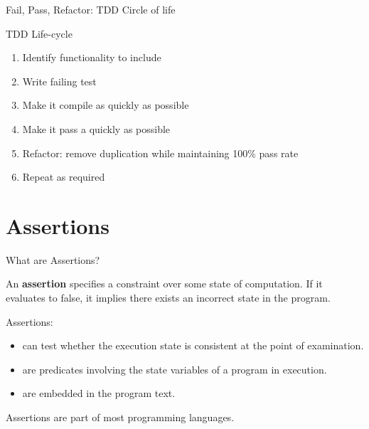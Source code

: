 \documentclass[11pt, xcolor=svgnames]{beamer}
\providecommand{\alert}[1]{\textbf{#1}}
\begin{document}


\begin{frame}{Fail, Pass, Refactor:  TDD Circle of life}

\begin{block}{TDD Life-cycle}
	\begin{enumerate}
		\item Identify functionality to include
		\item Write failing test
		\item Make it compile as quickly as possible
		\item Make it pass a quickly as possible
		\item Refactor: remove duplication while maintaining 100\% pass rate
		\item Repeat as required
	\end{enumerate}
\end{block}

\end{frame}


\section{Assertions}


\begin{frame}{What are Assertions?}

  An \alert{assertion} specifies a constraint over some state of computation. If it evaluates to false, it implies there exists an incorrect state in the program.
  
  Assertions: 
  
  \begin{itemize}
    \item can test whether the execution state is consistent at the point of examination.
    \item are predicates involving the state variables of a program in execution.
    \item are embedded in the program text.
  \end{itemize}
  
  Assertions are part of most programming languages.
  
  \end{frame}
\end{document}
